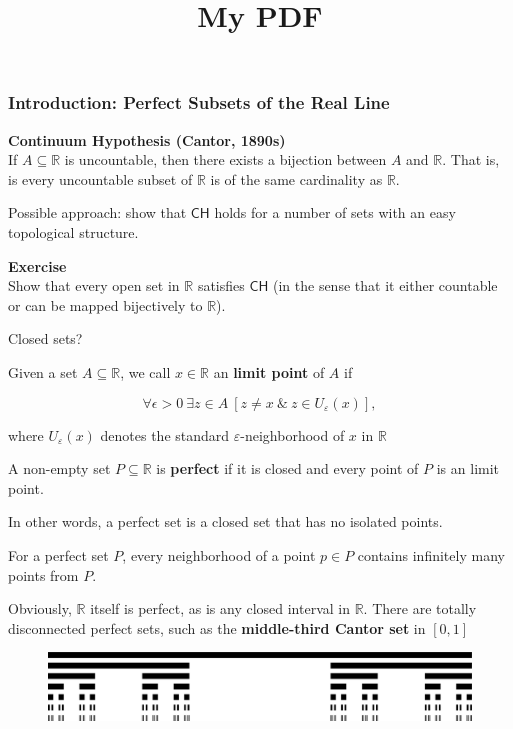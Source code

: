 \documentclass{article}
\title{My PDF}
\date{\displaydate{articleDate}}
\author{}
\newcommand{\Real}{\mathbb{R}}
\newcommand{\R}{\mathbb{R}}
\newcommand{\CH}{\mathsf{CH}}
\newcommand{\eps}{\varepsilon}
\begin{document}
\maketitle

\begin{frame}
\frametitle{Introduction: Perfect Subsets of the Real Line}

\begin{framed}
\textbf{Continuum Hypothesis (Cantor, 1890s)}\\
If $A \subseteq \Real$ is uncountable, then there exists a bijection between $A$ and $\Real$. That is, is every uncountable subset of $\Real$ is of the same cardinality as $\Real$.
\end{framed}

Possible approach: show that $\CH$ holds for a number of sets with an easy topological structure.

\begin{framed}
\textbf{Exercise}\\
Show that every open set in $\R$ satisfies $\CH$ (in the sense that it either countable or can be mapped bijectively to $\R$).
\end{framed}

Closed sets?

Given a set $A \subseteq \Real$, we call $x \in \Real$ an \textbf{limit point} of $A$ if

\begin{equation}
\forall \epsilon > 0 \: \exists z \in A \: [z \neq x \: \& \: z \in U_\eps(x)],
\end{equation}

where $U_\eps(x)$ denotes the standard $\eps$-neighborhood of $x$ in $\Real$

A non-empty set $P \subseteq \Real$ is \textbf{perfect} if it is closed and every point of $P$ is an limit point.

In other words, a perfect set is a closed set that has no isolated points.

For a perfect set $P$, every neighborhood of a point $p \in P$ contains infinitely many points from $P$.

Obviously, $\Real$ itself is perfect, as is any closed interval in $\Real$. There are totally disconnected perfect sets, such as the \textbf{middle-third Cantor set} in $[0,1]$

\begin{figure}[!htbp]
\centering
\includegraphics[width=0.7\linewidth]{files/Cantor_set-7f15a3eb647d25cf38092c5cd78d7432.png}
\end{figure}


\end{frame}
\end{document}
